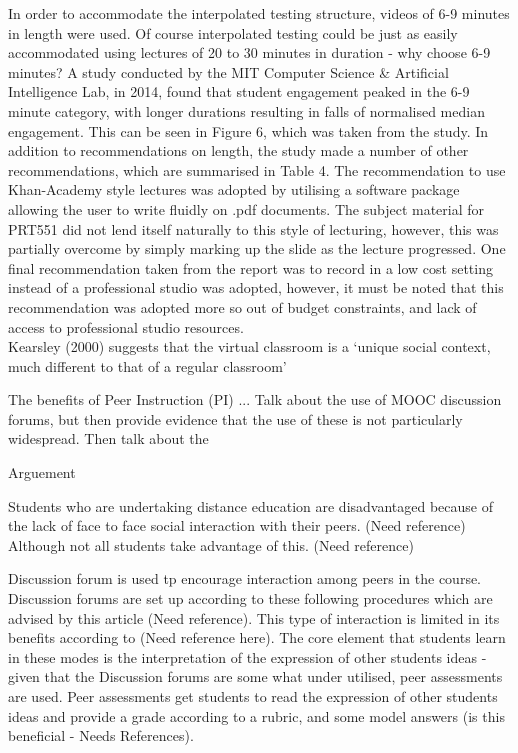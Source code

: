 \documentclass[a4paper]{article}
\begin{document}
In order to accommodate the interpolated testing structure, videos of 6-9 minutes in length were used. Of course interpolated testing could be just as easily accommodated using lectures of 20 to 30 minutes in duration - why choose 6-9 minutes? A study conducted by the MIT Computer Science \& Artificial Intelligence Lab, in 2014, found that student engagement peaked in the 6-9 minute category, with longer durations resulting in falls of normalised median engagement. This can be seen in Figure 6, which was taken from the study. In addition to recommendations on length, the study made a number of other recommendations, which are summarised in Table 4. The recommendation to use Khan-Academy style lectures was adopted by utilising a software package allowing the user to write fluidly on .pdf documents. The subject material for PRT551 did not lend itself naturally to this style of lecturing, however, this was partially overcome by simply marking up the slide as the lecture progressed. One final recommendation taken from the report was to record in a low cost setting instead of a professional studio was adopted, however, it must be noted that this recommendation was adopted more so out of budget constraints, and lack of access to professional studio resources.\\

Kearsley (2000) suggests that the virtual classroom is a `unique social context, much different to that of a regular classroom'

The benefits of Peer Instruction (PI) ...
Talk about the use of MOOC discussion forums, but then provide evidence that the use of these is not particularly widespread. Then talk about the 

Arguement

Students who are undertaking distance education are disadvantaged because of the lack of face to face social interaction with their peers. (Need reference) Although not all students take advantage of this. (Need reference)

Discussion forum is used tp encourage interaction among peers in the course. Discussion forums are set up according to these following procedures which are advised by this article (Need reference). This type of interaction is limited in its benefits according to (Need reference here). The core element that students learn in these modes is the interpretation of the expression of other students ideas - given that the Discussion forums are some what under utilised, peer assessments are used. Peer assessments get students to read the expression of other students ideas and provide a grade according to a rubric, and some model answers (is this beneficial - Needs References).
\end{document}
